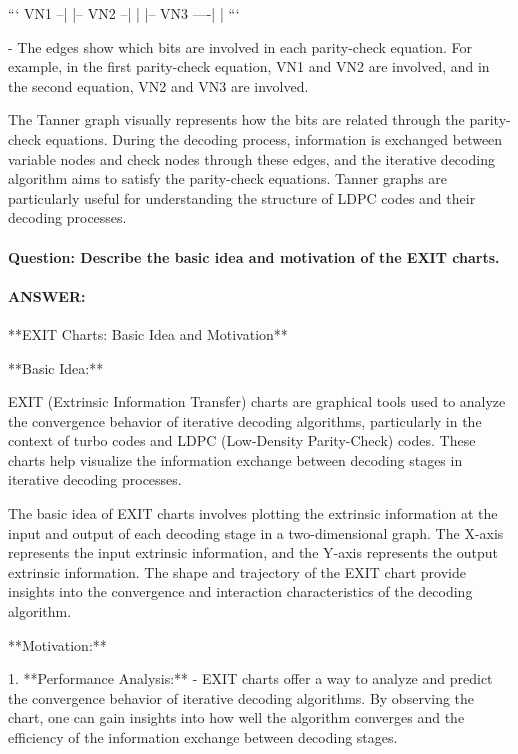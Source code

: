 \documentclass[colorlinks,11pt,a4paper,normalphoto,withhyper,ragged2e]{altareport}
\begin{document}
				```
				VN1 --|    |--
				VN2 --|    |    |--
				VN3 ----|    |
				```
				
				- The edges show which bits are involved in each parity-check equation. For example, in the first parity-check equation, VN1 and VN2 are involved, and in the second equation, VN2 and VN3 are involved.
				
				The Tanner graph visually represents how the bits are related through the parity-check equations. During the decoding process, information is exchanged between variable nodes and check nodes through these edges, and the iterative decoding algorithm aims to satisfy the parity-check equations. Tanner graphs are particularly useful for understanding the structure of LDPC codes and their decoding processes.
				
				
				
				
				\paragraph{Question: Describe the basic idea and motivation of the EXIT charts.}
				\paragraph{ANSWER:}
				
				**EXIT Charts: Basic Idea and Motivation**
				
				**Basic Idea:**
				
				EXIT (Extrinsic Information Transfer) charts are graphical tools used to analyze the convergence behavior of iterative decoding algorithms, particularly in the context of turbo codes and LDPC (Low-Density Parity-Check) codes. These charts help visualize the information exchange between decoding stages in iterative decoding processes.
				
				The basic idea of EXIT charts involves plotting the extrinsic information at the input and output of each decoding stage in a two-dimensional graph. The X-axis represents the input extrinsic information, and the Y-axis represents the output extrinsic information. The shape and trajectory of the EXIT chart provide insights into the convergence and interaction characteristics of the decoding algorithm.
				
				**Motivation:**
				
				1. **Performance Analysis:**
				- EXIT charts offer a way to analyze and predict the convergence behavior of iterative decoding algorithms. By observing the chart, one can gain insights into how well the algorithm converges and the efficiency of the information exchange between decoding stages.
				
\end{document}
